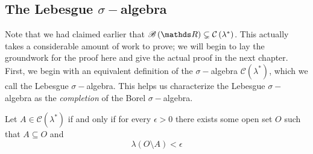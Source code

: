 \subsection{The Lebesgue $\sigma-$algebra}

Note that we had claimed earlier that $\borel\left(\R\right)\subsetneq\mathcal{C\left(\lambda^{*}\right)}$.
This actually takes a considerable amount of work to prove; we will
begin to lay the groundwork for the proof here and give the actual
proof in the next chapter. First, we begin with an equivalent definition
of the $\sigma-$algebra $\mathcal{C}\left(\lambda^{*}\right)$, which
we call the Lebesgue $\sigma-$algebra. This helps us characterize
the Lebesgue $\sigma-$algebra as the \emph{completion }of the Borel
$\sigma-$algebra.
\begin{prop}
\label{prop:borelApproximateLebesgue}Let $A\in\mathcal{C}\left(\lambda^{*}\right)$
if and only if for every $\epsilon>0$ there exists some open set
$O$ such that $A\subseteq O$ and
\[
\lambda\left(O\setminus A\right)<\epsilon
\]
\end{prop}

